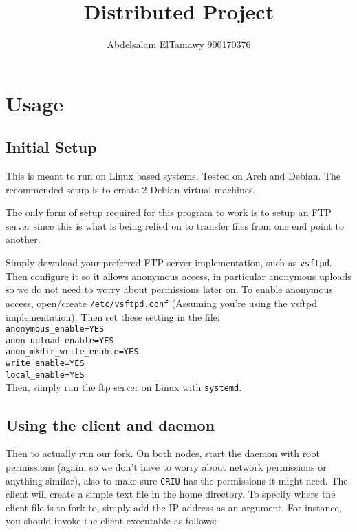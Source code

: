 \documentclass{article}
\author{Abdelsalam ElTamawy 900170376}
\title{Distributed Project}
\begin{document}
\maketitle

\section{Usage}

\subsection{Initial Setup}
This is meant to run on Linux based systems. Tested on Arch and Debian. The recommended setup is to create 2 Debian virtual machines.

The only form of setup required for this program to work is to setup an FTP server since this is what is being relied on to transfer files from one end point to another.

Simply download your preferred FTP server implementation, such as \verb|vsftpd|.
Then configure it so it allows anonymous access, in particular anonymous uploads so we do not need to worry about permissions later on.
To enable anonymous access, open/create \verb|/etc/vsftpd.conf| (Assuming you're using the vsftpd implementation). Then set these setting in the file:\\

\noindent \verb|anonymous_enable=YES|\\
\verb|anon_upload_enable=YES|\\
\verb|anon_mkdir_write_enable=YES|\\
\verb|write_enable=YES|\\
\verb|local_enable=YES|\\

Then, simply run the ftp server on Linux with \verb|systemd|.

\subsection{Using the client and daemon}
Then to actually run our fork. On both nodes, start the daemon with root permissions (again, so we don't have to worry about network permissions or anything similar), also to make sure \verb|CRIU| has the permissions it might need.
The client will create a simple text file in the home directory.
To specify where the client file is to fork to, simply add the IP address as an argument.
For instance, you should invoke the client executable as follows:\\
\end{document}
